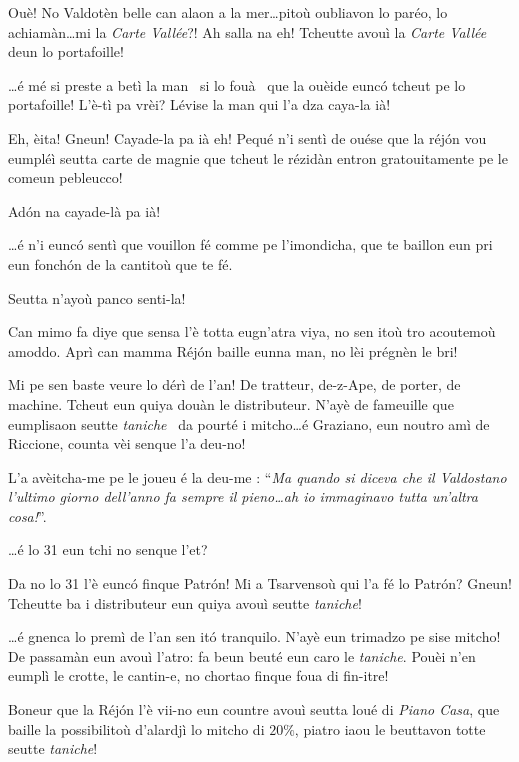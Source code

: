 \begin{drama}
\Laurentspeaks Ouè! No Valdotèn belle can alaon a la mer\ldots pitoù oubliavon lo paréo, lo achiamàn\ldots mi la \textit{Carte Vallée}?! Ah salla na eh! Tcheutte avouì la \textit{Carte Vallée} deun lo portafoille!

\Pierrespeaks \ldots é mé si preste a betì la man \man\ si lo fouà \foua\ que  la ouèide eunc\'o tcheut pe lo portafoille! L'è-tì pa vrèi? Lévise la man qui l'a dza caya-la ià! 

\Laurentspeaks Eh, èita! Gneun! Cayade-la pa ià eh! Pequé n'i sentì de ouése que la réj\'on vou eumpléì seutta carte de magnie que tcheut le rézidàn entron gratouitamente pe le comeun pebleucco!

\Pierrespeaks Ad\'on na cayade-là pa ià!

\Laurentspeaks \ldots é n'i eunc\'o sentì que vouillon fé comme pe l'imondicha, que te baillon eun pri eun fonch\'on de la cantitoù que te fé.

\Pierrespeaks Seutta n'ayoù panco senti-la!

\Laurentspeaks Can mimo fa diye que sensa l'è totta eugn'atra viya, no sen itoù tro acoutemoù amoddo. Aprì can mamma Réj\'on baille eunna man, no lèi prégnèn le bri!

\Pierrespeaks Mi pe sen baste veure lo dérì de l'an! De tratteur, de-z-Ape, de porter, de machine. Tcheut eun quiya douàn le distributeur\distributeur . N'ayè de fameuille que eumplisaon seutte \textit{taniche} \tanica\ da pourté i mitcho\ldots é Graziano, eun noutro amì de Riccione,  counta vèi senque l'a deu-no!

\Laurentspeaks L'a avèitcha-me pe le joueu é la deu-me : ``\textit{Ma quando si diceva che il Valdostano l'ultimo giorno dell'anno fa sempre il pieno\ldots ah io immaginavo tutta un'altra cosa!}''.

\Pierrespeaks \ldots é lo 31 eun tchi no senque l'et?

\Laurentspeaks Da no lo 31 l'è eunc\'o finque Patr\'on! Mi a Tsarvensoù qui l'a fé lo Patr\'on? Gneun! Tcheutte ba i distributeur eun quiya avouì seutte \textit{taniche}!

\Pierrespeaks \ldots é gnenca lo premì de l'an sen it\'o tranquilo. N'ayè eun trimadzo pe sise mitcho! De passamàn eun avouì l'atro: fa beun beuté eun caro le \textit{taniche}. Pouèi n'en eumplì le crotte, le cantin-e, no chortao finque foua di fin-itre!

\Laurentspeaks Boneur que la Réj\'on l'è vii-no eun countre avouì seutta loué di \textit{Piano Casa}, que baille la possibilitoù d'alardjì lo mitcho di $20\%$, piatro iaou le beuttavon totte seutte \textit{taniche}!


\end{drama}
